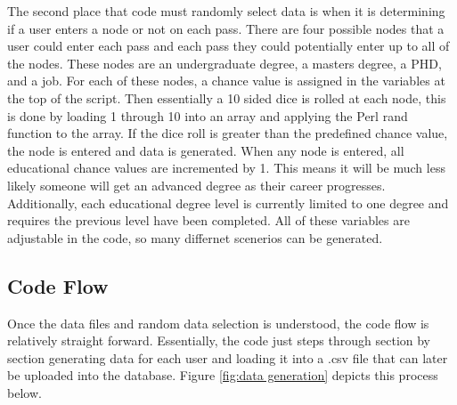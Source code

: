 The second place that code must randomly select data is when it is determining
if a user enters a node or not on each pass.  There are four possible nodes that
a user could enter each pass and each pass they could potentially enter up to
all of the nodes.  These nodes are an undergraduate degree, a masters degree, a
PHD, and a job.  For each of these nodes, a chance value is assigned in the
variables at the top of the script.  Then essentially a 10 sided dice is rolled
at each node, this is done by loading 1 through 10 into an array and applying
the Perl rand function to the array.  If the dice roll is greater than the
predefined chance value, the node is entered and data is generated.  When any
node is entered, all educational chance values are incremented by 1.  This means
it will be much less likely someone will get an advanced degree as their career
progresses.  Additionally, each educational degree level is currently limited to
one degree and requires the previous level have been completed.  All of these
variables are adjustable in the code, so many differnet scenerios can be
generated.


\subsection{Code Flow}
Once the data files and random data selection is understood, the code flow is
relatively straight forward.  Essentially, the code just steps through section
by section generating data for each user and loading it into a .csv file that
can later be uploaded into the database.  Figure \ref {fig:data generation}
depicts this process below.

\pagebreak
\usetikzlibrary{shapes,arrows,chains}

